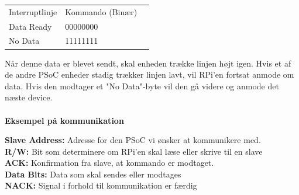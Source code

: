 \documentclass[Arkitektur/System_main.tex]{subfiles}
\begin{document}
\begin{table}[H]
\centering
\begin{tabular}{|l|l|l}
\cline{1-2}
Interruptlinje & Kommando (Binær) &  \\ \cline{1-2}
Data Ready & 00000000 &  \\ \cline{1-2}
No Data & 11111111 &  \\ \cline{1-2}
\end{tabular}
\end{table}
Når denne data er blevet sendt, skal enheden trække linjen højt igen. Hvis et af de andre PSoC enheder stadig trækker linjen lavt, vil RPi'en fortsat anmode om data. Hvis den modtager et "No Data"-byte vil den gå videre og anmode det næste device. 
\\\\\textbf{Eksempel på kommunikation}
\begin{table}[H]
\end{table}
\textbf{Slave Address:} Adresse for den PSoC vi ønsker at kommunikere med. \\
\textbf{R/W:} Bit som determinere om RPi'en skal læse eller skrive til en slave \\
\textbf{ACK:} Konfirmation fra slave, at kommando er modtaget. \\
\textbf{Data Bits:} Data som skal sendes eller modtages\\
\textbf{NACK:} Signal i forhold til kommunikation er færdig \\

\begin{table}[H]
\end{table}
\end{document}
